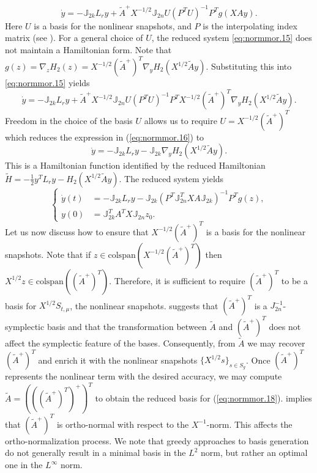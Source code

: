 {\begin{equation} \label{eq:normmor.15}
	\dot y = -\mathbb J_{2k} L_ry + \tilde A^+ X^{-1/2} \mathbb J_{2n} U (P^TU)^{-1} P^T g(XAy).
\end{equation}
Here $U$ is a basis for the nonlinear snapshots, and $P$ is the interpolating index matrix (see ). For a general choice of $U$, the reduced system \eqref{eq:normmor.15} does not maintain a Hamiltonian form. Note that $g(z) = \nabla_z H_2(z) = X^{-1/2}(\tilde A^+)^T \nabla_y H_2 ( X^{1/2} \tilde A y  )$. Substituting this into \eqref{eq:normmor.15} yields
\begin{equation} \label{eq:normmor.16}
	\dot y = -\mathbb J_{2k} L_ry + \tilde A^+ X^{-1/2} \mathbb J_{2n} U (P^TU)^{-1} P^T X^{-1/2}(\tilde A^+)^T \nabla_y H_2 ( X^{1/2} \tilde A y  ).
\end{equation}
Freedom in the choice of the basis $U$ allows us to require $U = X^{-1/2} (\tilde A^+)^T$ which reduces the expression in (\ref{eq:normmor.16}) to
\begin{equation} \label{eq:normmor.17}
	\dot y = - \mathbb J_{2k} L_ry - \mathbb J_{2k} \nabla_y H_2 ( X^{1/2} \tilde A y  ).
\end{equation}
This is a Hamiltonian function identified by the reduced Hamiltonian $\tilde H = -\frac 1 2 y^T L_r y - H_2(X^{1/2} \tilde A y)$. The reduced system yields
\begin{equation} \label{eq:normmor.18}
\left\{
\begin{aligned}
	\dot y(t) &= - \mathbb J_{2k} L_ry - \mathbb J_{2k} ( P^T \mathbb J_{2n}^T XA \mathbb J_{2k}  )^{-1} P^T g(z), \\
	y(0) &= \mathbb J_{2k}^T A^T X \mathbb J_{2n} z_0.
\end{aligned}
\right.
\end{equation}
}
Let us now discuss how to ensure that $X^{-1/2} (\tilde A^+)^T$ is a basis for the nonlinear snapshots. Note that if $z \in \text{colspan}\left(X^{-1/2} (\tilde A^+)^T\right)$ then $X^{1/2} z \in \text{colspan}\left(( \tilde A^+)^T \right)$. Therefore, it is sufficient to require $(\tilde A^+)^T$ to be a basis for $X^{1/2}S_{t,\mu}$, the nonlinear snapshots.  suggests that $(\tilde A^+)^T$ is a $J_{2n}^{-1}$-symplectic basis and that the transformation between $\tilde A$ and $(\tilde A^+)^T $ does not affect the symplectic feature of the bases. Consequently, from $\tilde A$ we may recover $(\tilde A^+)^T$ and enrich it with the nonlinear snapshots $\{ X^{1/2} s \}_{s\in S_{g}}$. Once $(\tilde A^+)^T$ represents the nonlinear term with the desired accuracy, we may compute $\tilde A= \left( \left( ( \tilde A^+ )^T \right)^+ \right)^T$ to obtain the reduced basis for (\ref{eq:normmor.18}).  implies that $(\tilde A^+)^T$ is ortho-normal with respect to the $X^{-1}$-norm. This affects the ortho-normalization process. We note that greedy approaches to basis generation do not generally result in a minimal basis in the $L^{2}$ norm, but rather an optimal one in the $L^{\infty}$ norm.

